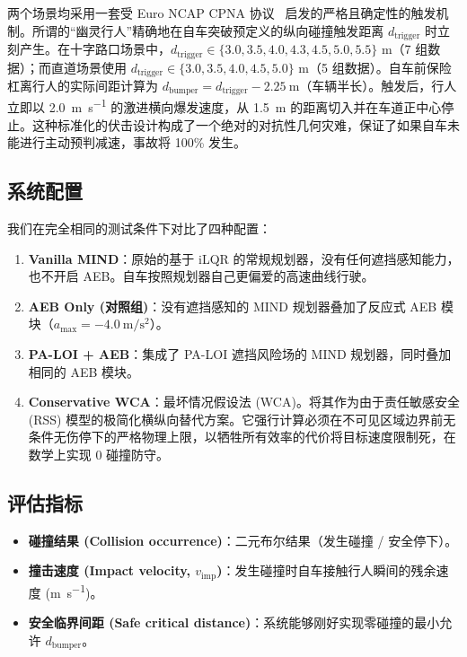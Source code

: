 \documentclass[conference]{IEEEtran}
\begin{document}
两个场景均采用一套受 Euro NCAP CPNA 协议~\cite{euroncap2023} 启发的严格且确定性的触发机制。所谓的“幽灵行人”精确地在自车突破预定义的纵向碰撞触发距离 $d_{\text{trigger}}$ 时立刻产生。在十字路口场景中，$d_{\text{trigger}} \in \{3.0, 3.5, 4.0, 4.3, 4.5, 5.0, 5.5\}$ m（7 组数据）；而直道场景使用 $d_{\text{trigger}} \in \{3.0, 3.5, 4.0, 4.5, 5.0\}$ m（5 组数据）。自车前保险杠离行人的实际间距计算为 $d_{\text{bumper}} = d_{\text{trigger}} - \SI{2.25}{\meter}$（车辆半长）。触发后，行人立即以 \SI{2.0}{\meter\per\second} 的激进横向爆发速度，从 \SI{1.5}{\meter} 的距离切入并在车道正中心停止。这种标准化的伏击设计构成了一个绝对的对抗性几何灾难，保证了如果自车未能进行主动预判减速，事故将 100\% 发生。

\subsection{系统配置}
我们在完全相同的测试条件下对比了四种配置：
\begin{enumerate}
    \item \textbf{Vanilla MIND}：原始的基于 iLQR 的常规规划器，没有任何遮挡感知能力，也不开启 AEB。自车按照规划器自己更偏爱的高速曲线行驶。
    \item \textbf{AEB Only (对照组)}：没有遮挡感知的 MIND 规划器叠加了反应式 AEB 模块（$a_{\text{max}} = \SI{-4.0}{\meter\per\second\squared}$）。
    \item \textbf{PA-LOI + AEB}：集成了 PA-LOI 遮挡风险场的 MIND 规划器，同时叠加相同的 AEB 模块。
    \item \textbf{Conservative WCA}：最坏情况假设法 (WCA)。将其作为由于责任敏感安全 (RSS) 模型的极简化横纵向替代方案。它强行计算必须在不可见区域边界前无条件无伤停下的严格物理上限，以牺牲所有效率的代价将目标速度限制死，在数学上实现 0 碰撞防守。
\end{enumerate}

\subsection{评估指标}
\begin{itemize}
    \item \textbf{碰撞结果 (Collision occurrence)}：二元布尔结果（发生碰撞 / 安全停下）。
    \item \textbf{撞击速度 (Impact velocity, $v_{\text{imp}}$)}：发生碰撞时自车接触行人瞬间的残余速度 (\si{\meter\per\second})。
    \item \textbf{安全临界间距 (Safe critical distance)}：系统能够刚好实现零碰撞的最小允许 $d_{\text{bumper}}$。
\end{itemize}
\end{document}
